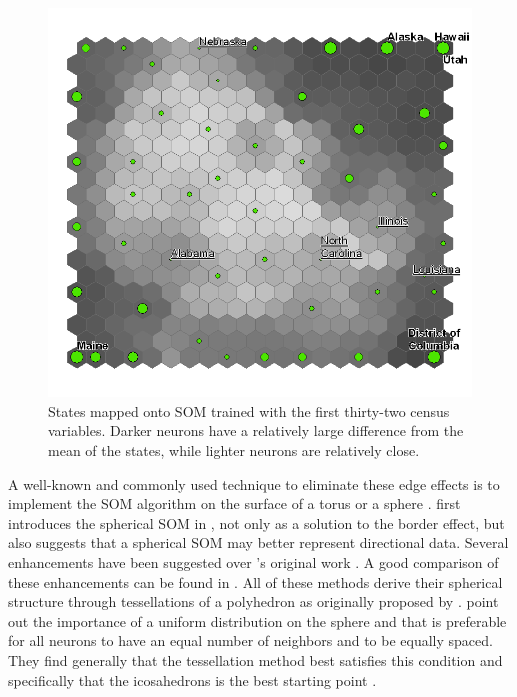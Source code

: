 \documentclass[12pt]{article}
\begin{document}
\begin{figure}
\centering
\includegraphics[width=0.85\linewidth]{gridedge.png}
\caption{States mapped onto SOM trained with the first thirty-two census
variables.  Darker neurons have a relatively large difference from the mean of
the states, while lighter neurons are relatively close.}
\label{figure1}
\end{figure}

A well-known and commonly used technique to eliminate these edge effects is to
implement the SOM algorithm on the surface of a torus or a sphere \citep{ritter99}.
\citeauthor{ritter99} first introduces the spherical SOM in
\citeyear{ritter99}, not only as a solution to the border effect, but also
suggests that a spherical SOM may better represent directional data. Several
enhancements have been suggested over \citeauthor{ritter99}'s original work
\citep{Wu:2006lr,Sangole:2003lr,Nishio:2006fk,boudjemai2003}.  A good
comparison of these enhancements can be found in \citep{Wu:2006lr}.  All of
these methods derive their spherical structure through tessellations of a
polyhedron as originally proposed by \citeauthor{ritter99}.  \cite{Wu:2006lr}
point out the importance of a uniform distribution on the sphere and that is
preferable for all neurons to have an equal number of neighbors and to be
equally spaced.  They find generally that the tessellation method best
satisfies this condition and specifically that the icosahedrons is the best
starting point \citep{wu2005}.
\end{document}
